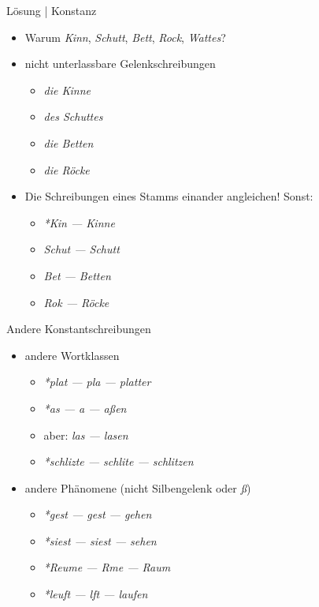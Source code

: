 \begin{frame}
  {Lösung | Konstanz}
  \begin{itemize}[<+->]
    \item Warum \textit{Kinn}, \textit{Schutt}, \textit{Bett}, \textit{Rock}, \textit{Wattes}?
      \Halbzeile
    \item \alert{nicht unterlassbare Gelenkschreibungen}
      \begin{itemize}[<+->]
        \item \textit{die Ki\alert{nn}e}
        \item \textit{des Schu\alert{tt}es}
        \item \textit{die Be\alert{tt}en}
        \item \textit{die Rö\alert{ck}e}
      \end{itemize}
      \Halbzeile
    \item \alert{Die Schreibungen eines Stamms einander angleichen!} Sonst:
      \begin{itemize}[<+->]
        \item \textit{*Kin --- Kinne}
        \item \textit{Schut --- Schutt}
        \item \textit{Bet --- Betten}
        \item \textit{Rok --- Röcke}
      \end{itemize}
  \end{itemize}
\end{frame}

\begin{frame}
  {Andere Konstantschreibungen}
  \pause
  \begin{itemize}[<+->]
    \item andere Wortklassen
      \begin{itemize}[<+->]
        \item \textit{*plat --- pla --- pla\alert{tt}er}
        \item \textit{*as --- a --- a\alert{ß}en}
        \item aber: \textit{las --- lasen}
        \item \textit{*schlizte --- schlite --- schli\alert{tz}en}
      \end{itemize}
      \Halbzeile
    \item andere Phänomene (nicht Silbengelenk oder \textit{ß})
      \begin{itemize}[<+->]
        \item \textit{*gest --- gest --- ge\alert{h}en}
        \item \textit{*siest --- siest --- se\alert{h}en}
        \item \textit{*Reume --- Rme --- R\alert{au}m}
        \item \textit{*leuft --- lft --- l\alert{au}fen}
      \end{itemize}
  \end{itemize}
\end{frame}


